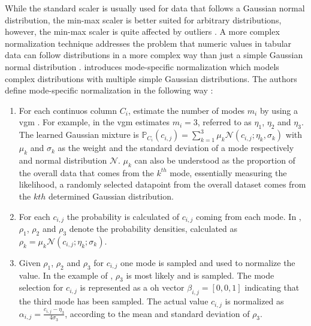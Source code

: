 While the standard scaler is usually used for data that follows a Gaussian normal distribution, the min-max scaler is better suited for arbitrary distributions, however, the min-max scaler is quite affected by outliers \cite{choudhury2020FeatureScalingEffect}.
A more complex normalization technique addresses the problem that numeric values in tabular data can follow distributions in a more complex way than just a simple Gaussian normal distribution \cite{zhao2022CTABGANEnhancingTabular, xu2019ModelingTabularData}.
\textcite{xu2019ModelingTabularData} introduces mode-specific normalization which models complex distributions with multiple simple Gaussian distributions.
The authors define mode-specific normalization in the following way \cite[p. 3-4]{xu2019ModelingTabularData}:

\begin{enumerate}
    \item For each continuos column $C_i$, estimate the number of modes $m_i$ by using a \gls{vgm} \cite{bishop2006PatternRecognitionMachine}. 
    For example, in  the \gls{vgm} estimates $m_i=3$, referred to as $\eta_1$, $\eta_2$ and $\eta_3$. 
    The learned Gaussian mixture is  
    $\mathbb{P}_{C_i}(c_{i,j})=\sum_{k=1}^{3}\mu_k\mathcal{N}(c_{i,j};\eta_k, \sigma_k)$
    with $\mu_k$ and $\sigma_k$ as the weight and the standard deviation of a mode respectively and normal distribution $\mathcal{N}$.
    $\mu_k$ can also be understood as the proportion of the overall data that comes from the $k^{th}$ mode, essentially measuring the likelihood, a randomly selected datapoint from the overall dataset comes from the $kth$ determined Gaussian distribution.
    \item For each $c_{i,j}$ the probability is calculated of $c_{i,j}$ coming from each mode. 
    In , $\rho_1$, $\rho_2$ and $\rho_3$ denote the probability densities, calculated as $\rho_k=\mu_k\mathcal{N}(c_{i,j};\eta_k;\sigma_k)$.
    \item Given $\rho_1$, $\rho_2$ and $\rho_3$ for $c_{i,j}$ one mode is sampled and used to normalize the value. 
    In the example of , $\rho_3$ is most likely and is sampled.
    The mode selection for $c_{i,j}$ is represented as a \gls{oh} vector $\beta_{i,j}=[0,0,1]$ indicating that the third mode has been sampled.
    The actual value $c_{i,j}$ is normalized as $\alpha_{i,j}=\frac{c_{i,j}-\eta_3}{4\sigma_3}$, according to the mean and standard deviation of $\rho_3$. 
\end{enumerate}

